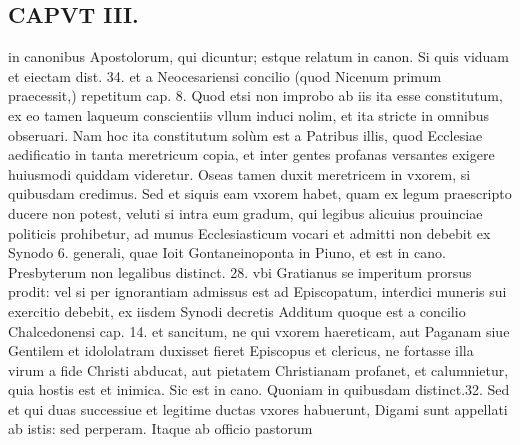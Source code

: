 \documentclass{article}
\begin{document}
\begin{pages}
\section*{CAPVT  III. }
\marginpar{[ p.109 ]}\pstart in canonibus Apostolorum, qui dicuntur; estque relatum in canon. Si quis viduam et eiectam dist. 34. et a Neocesariensi concilio (quod Nicenum primum praecessit,) repetitum cap. 8. Quod etsi non improbo ab iis ita esse constitutum, ex eo tamen laqueum conscientiis vllum induci nolim, et ita stricte in omnibus obseruari. Nam hoc ita constitutum solùm est a Patribus illis, quod Ecclesiae aedificatio in tanta meretricum copia, et inter gentes profanas versantes exigere huiusmodi quiddam videretur. Oseas tamen duxit meretricem in vxorem, si quibusdam credimus. Sed et siquis eam vxorem habet, quam ex legum praescripto ducere non potest, veluti si intra eum gradum, qui legibus alicuius prouinciae politicis prohibetur, ad munus Ecclesiasticum vocari et admitti non debebit ex Synodo 6. generali, quae Ioit Gontaneinoponta in Piuno, et est in cano. Presbyterum non legalibus distinct. 28. vbi Gratianus se imperitum prorsus prodit: vel si per ignorantiam admissus est ad Episcopatum, interdici muneris sui exercitio debebit, ex iisdem Synodi decretis  \pend\pstart Additum quoque est a concilio Chalcedonensi cap. 14. et sancitum, ne qui vxorem haereticam, aut Paganam siue Gentilem et idololatram duxisset fieret Episcopus et clericus, ne fortasse illa virum a fide Christi abducat, aut pietatem Christianam profanet, et calumnietur, quia hostis est et inimica. Sic est in cano. Quoniam in quibusdam distinct.32. Sed et qui duas successiue et legitime ductas vxores habuerunt, Digami sunt appellati ab istis: sed perperam. Itaque ab officio pastorum  \pend

\end{pages}
\end{document}
